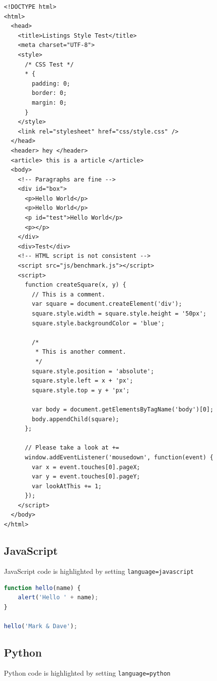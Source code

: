 \documentclass[a4paper,10pt]{ehu_webdev_report}
\begin{document}
\begin{lstlisting}[style=htmlcssjs]
<!DOCTYPE html>
<html>
  <head>
    <title>Listings Style Test</title>
    <meta charset="UTF-8">
    <style>
      /* CSS Test */
      * {
        padding: 0;
        border: 0;
        margin: 0;
      }
    </style>
    <link rel="stylesheet" href="css/style.css" />
  </head>
  <header> hey </header>
  <article> this is a article </article>
  <body>
    <!-- Paragraphs are fine -->
    <div id="box">
      <p>Hello World</p>
      <p>Hello World</p>
      <p id="test">Hello World</p>
      <p></p>
    </div>
    <div>Test</div>
    <!-- HTML script is not consistent -->
    <script src="js/benchmark.js"></script>
    <script>
      function createSquare(x, y) {
        // This is a comment.
        var square = document.createElement('div');
        square.style.width = square.style.height = '50px';
        square.style.backgroundColor = 'blue';
        
        /*
         * This is another comment.
         */
        square.style.position = 'absolute';
        square.style.left = x + 'px'; 
        square.style.top = y + 'px';
        
        var body = document.getElementsByTagName('body')[0];
        body.appendChild(square);
      };
      
      // Please take a look at +=
      window.addEventListener('mousedown', function(event) {
        var x = event.touches[0].pageX;
        var y = event.touches[0].pageY;
        var lookAtThis += 1;
      });
    </script>
  </body>
</html>
\end{lstlisting}

\subsection{JavaScript}

JavaScript code is highlighted by setting \texttt{language=javascript}

\begin{lstlisting}[language=javascript]
function hello(name) {
    alert('Hello ' + name);
}

hello('Mark & Dave');
\end{lstlisting}

\subsection{Python}

Python code is highlighted by setting \texttt{language=python}
\end{document}
